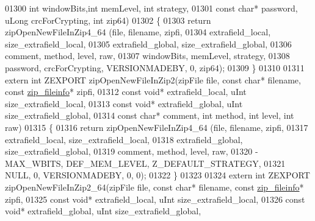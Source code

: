 \begin{DoxyCode}
01300                                          \textcolor{keywordtype}{int} windowBits,\textcolor{keywordtype}{int} memLevel, \textcolor{keywordtype}{int} strategy,
01301                                          \textcolor{keyword}{const} \textcolor{keywordtype}{char}* password, uLong crcForCrypting, \textcolor{keywordtype}{int} zip64)
01302 \{
01303     \textcolor{keywordflow}{return} zipOpenNewFileInZip4\_64 (file, filename, zipfi,
01304                                  extrafield\_local, size\_extrafield\_local,
01305                                  extrafield\_global, size\_extrafield\_global,
01306                                  comment, method, level, raw,
01307                                  windowBits, memLevel, strategy,
01308                                  password, crcForCrypting, VERSIONMADEBY, 0, zip64);
01309 \}
01310 
01311 \textcolor{keyword}{extern} \textcolor{keywordtype}{int} ZEXPORT zipOpenNewFileInZip2(zipFile file, \textcolor{keyword}{const} \textcolor{keywordtype}{char}* filename, \textcolor{keyword}{const} 
      \hyperlink{structzip__fileinfo}{zip\_fileinfo}* zipfi,
01312                                         \textcolor{keyword}{const} \textcolor{keywordtype}{void}* extrafield\_local, uInt size\_extrafield\_local,
01313                                         \textcolor{keyword}{const} \textcolor{keywordtype}{void}* extrafield\_global, uInt size\_extrafield\_global,
01314                                         \textcolor{keyword}{const} \textcolor{keywordtype}{char}* comment, \textcolor{keywordtype}{int} method, \textcolor{keywordtype}{int} level, \textcolor{keywordtype}{int} raw)
01315 \{
01316     \textcolor{keywordflow}{return} zipOpenNewFileInZip4\_64 (file, filename, zipfi,
01317                                  extrafield\_local, size\_extrafield\_local,
01318                                  extrafield\_global, size\_extrafield\_global,
01319                                  comment, method, level, raw,
01320                                  -MAX\_WBITS, DEF\_MEM\_LEVEL, Z\_DEFAULT\_STRATEGY,
01321                                  NULL, 0, VERSIONMADEBY, 0, 0);
01322 \}
01323 
01324 \textcolor{keyword}{extern} \textcolor{keywordtype}{int} ZEXPORT zipOpenNewFileInZip2\_64(zipFile file, \textcolor{keyword}{const} \textcolor{keywordtype}{char}* filename, \textcolor{keyword}{const} 
      \hyperlink{structzip__fileinfo}{zip\_fileinfo}* zipfi,
01325                                         \textcolor{keyword}{const} \textcolor{keywordtype}{void}* extrafield\_local, uInt size\_extrafield\_local,
01326                                         \textcolor{keyword}{const} \textcolor{keywordtype}{void}* extrafield\_global, uInt size\_extrafield\_global,

\end{DoxyCode}
